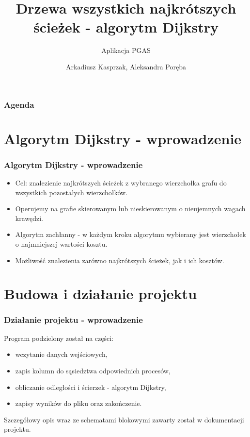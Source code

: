 \documentclass[10pt]{beamer}
\title{Drzewa wszystkich najkrótszych ścieżek - algorytm Dijkstry}
\subtitle{\normalsize{Aplikacja PGAS}}
\date{}
\author{\normalsize{Arkadiusz Kasprzak, Aleksandra Poręba}}
\begin{document}
\titleframe[pl]

\begin{frame}
\frametitle{Agenda}
\tableofcontents
\end{frame}

\section{Algorytm Dijkstry - wprowadzenie}

\begin{frame}
\frametitle{Algorytm Dijkstry - wprowadzenie}
\begin{itemize}
\item Cel: znalezienie najkrótszych ścieżek z wybranego wierzchołka grafu do wszystkich pozostałych wierzchołków.
\item Operujemy na grafie skierowanym lub nieskierowanym o nieujemnych wagach krawędzi.
\item Algorytm zachłanny - w każdym kroku algorytmu wybierany jest wierzchołek o najmniejszej wartości kosztu.
\item Możliwość znalezienia zarówno najkrótszych ścieżek, jak i ich kosztów.
\end{itemize}
\end{frame}

\section{Budowa i działanie projektu}

\begin{frame}
\frametitle{Działanie projektu - wprowadzenie}
Program podzielony został na części:
\begin{itemize}
\item wczytanie danych wejściowych,
\item zapis kolumn do sąsiedztwa odpowiednich procesów,
\item obliczanie odległości i ścierzek - algorytm Dijkstry,
\item zapisy wyników do pliku oraz zakończenie.
\end{itemize}

Szczegółowy opis wraz ze schematami blokowymi zawarty został w dokumentacji projektu.
\end{frame}
\end{document}
